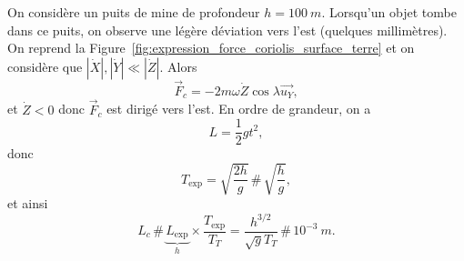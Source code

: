                 On considère un puits de mine de profondeur $h=100~m$. Lorsqu'un objet tombe dans ce puits, on observe une légère déviation vers l'est (quelques millimètres). On reprend la Figure~\ref{fig:expression_force_coriolis_surface_terre} et on considère que $\left\lvert\dot{X}\right\rvert,\left\lvert\dot{Y}\right\rvert\ll\left\lvert\dot{Z}\right\rvert$. Alors 
                \begin{equation}
                    \vec{F}_c=-2m\omega\dot{Z}\cos\lambda \vec{u_Y},
                \end{equation}
                et $\dot{Z}<0$ donc $\vec{F}_c$ est dirigé vers l'est. En ordre de grandeur, on a 
                \begin{equation}
                    L=\frac{1}{2}gt^{2},
                \end{equation}
                donc 
                \begin{equation}
                    T_{\text{exp}}=\sqrt{\frac{2h}{g}}\,\#\,\sqrt{\frac{h}{g}},
                \end{equation}
                et ainsi
                \begin{equation}
                    L_c\,\#\,\underbrace{L_{\text{exp}}}_{h}\times\frac{T_{\text{exp}}}{T_T}=\frac{h^{3/2}}{\sqrt{g}T_T}\,\#\,10^{-3}~m.
                \end{equation}

                    

            
            

        